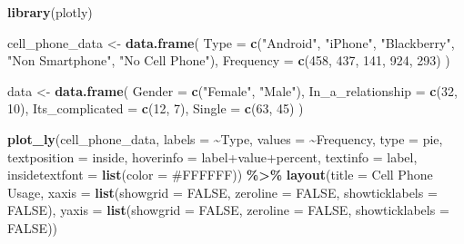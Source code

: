 \documentclass[
]{book}
\newenvironment{Shaded}{\begin{snugshade}}{\end{snugshade}}
\newcommand{\AttributeTok}[1]{\textcolor[rgb]{0.13,0.29,0.53}{#1}}
\newcommand{\ConstantTok}[1]{\textcolor[rgb]{0.56,0.35,0.01}{#1}}
\newcommand{\DecValTok}[1]{\textcolor[rgb]{0.00,0.00,0.81}{#1}}
\newcommand{\FunctionTok}[1]{\textcolor[rgb]{0.13,0.29,0.53}{\textbf{#1}}}
\newcommand{\NormalTok}[1]{#1}
\newcommand{\OtherTok}[1]{\textcolor[rgb]{0.56,0.35,0.01}{#1}}
\newcommand{\SpecialCharTok}[1]{\textcolor[rgb]{0.81,0.36,0.00}{\textbf{#1}}}
\newcommand{\StringTok}[1]{\textcolor[rgb]{0.31,0.60,0.02}{#1}}
\begin{document}
\begin{Shaded}
\begin{Highlighting}[]
\FunctionTok{library}\NormalTok{(plotly)}

\NormalTok{cell\_phone\_data }\OtherTok{\textless{}{-}} \FunctionTok{data.frame}\NormalTok{(}
  \AttributeTok{Type =} \FunctionTok{c}\NormalTok{(}\StringTok{"Android"}\NormalTok{, }\StringTok{"iPhone"}\NormalTok{, }\StringTok{"Blackberry"}\NormalTok{, }\StringTok{"Non Smartphone"}\NormalTok{, }\StringTok{"No Cell Phone"}\NormalTok{),}
  \AttributeTok{Frequency =} \FunctionTok{c}\NormalTok{(}\DecValTok{458}\NormalTok{, }\DecValTok{437}\NormalTok{, }\DecValTok{141}\NormalTok{, }\DecValTok{924}\NormalTok{, }\DecValTok{293}\NormalTok{)}
\NormalTok{)}

\NormalTok{data }\OtherTok{\textless{}{-}} \FunctionTok{data.frame}\NormalTok{(}
  \AttributeTok{Gender =} \FunctionTok{c}\NormalTok{(}\StringTok{"Female"}\NormalTok{, }\StringTok{"Male"}\NormalTok{),}
  \AttributeTok{In\_a\_relationship =} \FunctionTok{c}\NormalTok{(}\DecValTok{32}\NormalTok{, }\DecValTok{10}\NormalTok{),}
  \AttributeTok{Its\_complicated =} \FunctionTok{c}\NormalTok{(}\DecValTok{12}\NormalTok{, }\DecValTok{7}\NormalTok{),}
  \AttributeTok{Single =} \FunctionTok{c}\NormalTok{(}\DecValTok{63}\NormalTok{, }\DecValTok{45}\NormalTok{)}
\NormalTok{)}
\end{Highlighting}
\end{Shaded}

\begin{Shaded}
\begin{Highlighting}[]
\FunctionTok{plot\_ly}\NormalTok{(cell\_phone\_data, }\AttributeTok{labels =} \SpecialCharTok{\textasciitilde{}}\NormalTok{Type, }\AttributeTok{values =} \SpecialCharTok{\textasciitilde{}}\NormalTok{Frequency, }\AttributeTok{type =} \StringTok{\textquotesingle{}pie\textquotesingle{}}\NormalTok{,}
        \AttributeTok{textposition =} \StringTok{\textquotesingle{}inside\textquotesingle{}}\NormalTok{, }\AttributeTok{hoverinfo =} \StringTok{\textquotesingle{}label+value+percent\textquotesingle{}}\NormalTok{,}
        \AttributeTok{textinfo =} \StringTok{\textquotesingle{}label\textquotesingle{}}\NormalTok{, }\AttributeTok{insidetextfont =} \FunctionTok{list}\NormalTok{(}\AttributeTok{color =} \StringTok{\textquotesingle{}\#FFFFFF\textquotesingle{}}\NormalTok{)) }\SpecialCharTok{\%\textgreater{}\%}
  \FunctionTok{layout}\NormalTok{(}\AttributeTok{title =} \StringTok{\textquotesingle{}Cell Phone Usage\textquotesingle{}}\NormalTok{,}
         \AttributeTok{xaxis =} \FunctionTok{list}\NormalTok{(}\AttributeTok{showgrid =} \ConstantTok{FALSE}\NormalTok{, }\AttributeTok{zeroline =} \ConstantTok{FALSE}\NormalTok{, }\AttributeTok{showticklabels =} \ConstantTok{FALSE}\NormalTok{),}
         \AttributeTok{yaxis =} \FunctionTok{list}\NormalTok{(}\AttributeTok{showgrid =} \ConstantTok{FALSE}\NormalTok{, }\AttributeTok{zeroline =} \ConstantTok{FALSE}\NormalTok{, }\AttributeTok{showticklabels =} \ConstantTok{FALSE}\NormalTok{))}
\end{Highlighting}
\end{Shaded}
\end{document}
